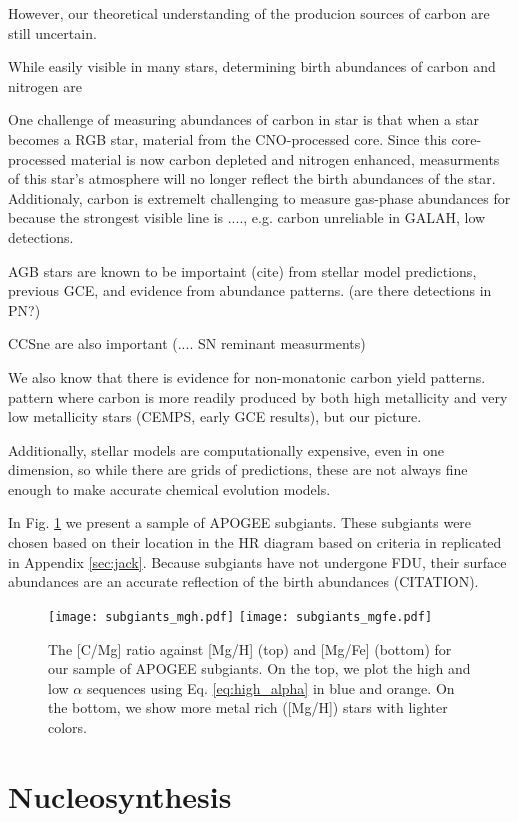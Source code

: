 \documentclass[12pt,oneside]{report}
\begin{document}
However, our theoretical understanding of the producion sources of carbon are still uncertain.

While easily visible in many stars, determining birth abundances of carbon and nitrogen are 

One challenge of measuring abundances of carbon in star is that when a star becomes a RGB star, material from the CNO-processed core. Since this core-processed material is now carbon depleted and nitrogen enhanced, measurments of this star's atmosphere will no longer reflect the birth abundances of the star.
Additionaly, carbon is extremelt challenging to measure gas-phase abundances for because the strongest visible line is ...., e.g. carbon unreliable in GALAH, low detections.

AGB stars are known to be importaint (cite) from stellar model predictions, previous GCE, and evidence from abundance patterns. (are there detections in PN?)

CCSne are also important (.... SN reminant measurments)

We also know that there is evidence for non-monatonic carbon yield patterns. 
pattern where carbon is more readily produced by both high metallicity and very low metallicity stars (CEMPS, early GCE results), but our picture.

Additionally, stellar models are computationally expensive, even in one dimension, so while there are grids of predictions, these are not always fine enough to make accurate chemical evolution models. 


In Fig. \ref{fig:subgiants} we present a sample of APOGEE subgiants. These subgiants were chosen based on their location in the HR diagram based on criteria in \citet{jack_subgiant} replicated in Appendix \ref{sec:jack}. Because subgiants have not undergone FDU, their surface abundances are an accurate reflection of the birth abundances (CITATION).  




\begin{figure}[htp]
    \texttt{[image: subgiants\_mgh.pdf]}
    \texttt{[image: subgiants\_mgfe.pdf]}
    \caption[APOGEE Subgiants]{The [C/Mg] ratio against [Mg/H] (top) and [Mg/Fe] (bottom) for our sample of APOGEE subgiants. On the top, we plot the high and low $\alpha$ sequences using Eq. \ref{eq:high_alpha} in blue and orange. On the bottom, we show more metal rich ([Mg/H]) stars with lighter colors.}
    \label{fig:subgiants}
\end{figure}
\chapter{Nucleosynthesis}
\end{document}
